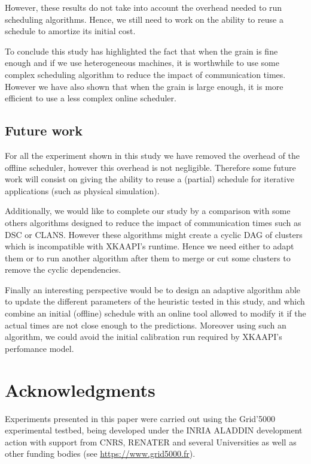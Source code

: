 \documentclass[10pt, conference, compsocconf,pdftex,dvipsnames]{IEEEtran}
\begin{document}
However, these results do not take into account the overhead needed to run
scheduling algorithms. Hence, we still need to work on the ability to reuse a
schedule to amortize its initial cost. 

To conclude this study has highlighted the fact that when the grain is fine
enough and if we use heterogeneous machines, it is worthwhile to use some 
complex scheduling algorithm to reduce the impact of communication times.
However we have also shown that when the grain is large enough, it is more
efficient to use a less complex online scheduler.

\subsection{Future work }
\label{chap:cncl-work}

For all the experiment shown in this study we have removed the overhead of the
offline scheduler, however this overhead is not negligible. Therefore some
future work will consist on giving the ability to reuse a (partial) schedule
for iterative applications (such as physical simulation).

Additionally, we would like to complete our study by a comparison with some
others algorithms designed to reduce the impact of communication times such as
DSC or CLANS. However these algorithms might create a cyclic DAG of clusters
which is incompatible with XKAAPI's runtime. Hence we need either to adapt
them or to run another algorithm after them to merge or cut some clusters to
remove the cyclic dependencies.

Finally an interesting perspective would be to design an adaptive algorithm
able to update the different parameters of the heuristic tested in this study,
and which combine an initial (offline) schedule with an online tool allowed to
modify it if the actual times are not close enough to the predictions. Moreover
using such an algorithm, we could avoid the initial calibration run required
by XKAAPI's perfomance model.

\section*{Acknowledgments}

Experiments presented in this paper were carried out using the Grid'5000
experimental testbed, being developed under the INRIA ALADDIN development 
action with support from CNRS, RENATER and several Universities as well as
other funding bodies (see \url{https://www.grid5000.fr}).
\end{document}
